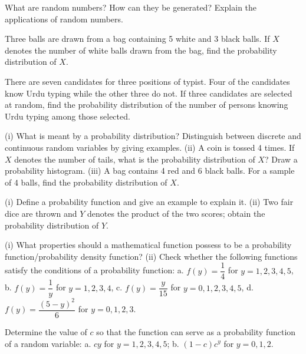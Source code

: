 \documentclass[11pt,a4paper]{article}
\begin{document}
\begin{longlist}
\item What are random numbers? How can they be generated? Explain the applications of random numbers.

\item Three balls are drawn from a bag containing 5 white and 3 black balls. If $X$ denotes the number of white balls drawn from the bag, find the probability distribution of $X$.

\item There are seven candidates for three positions of typist. Four of the candidates know Urdu typing while the other three do not. If three candidates are selected at random, find the probability distribution of the number of persons knowing Urdu typing among those selected.

\item (i) What is meant by a probability distribution? Distinguish between discrete and continuous random variables by giving examples. (ii) A coin is tossed 4 times. If $X$ denotes the number of tails, what is the probability distribution of $X$? Draw a probability histogram. (iii) A bag contains 4 red and 6 black balls. For a sample of 4 balls, find the probability distribution of $X$.

\item (i) Define a probability function and give an example to explain it. (ii) Two fair dice are thrown and $Y$ denotes the product of the two scores; obtain the probability distribution of $Y$.

\item (i) What properties should a mathematical function possess to be a probability function/probability density function? (ii) Check whether the following functions satisfy the conditions of a probability function: a. $f(y)=\dfrac{1}{4}$ for $y=1,2,3,4,5$, b. $f(y)=\dfrac{1}{y}$ for $y=1,2,3,4$, c. $f(y)=\dfrac{y}{15}$ for $y=0,1,2,3,4,5$, d. $f(y)=\dfrac{(5-y)^2}{6}$ for $y=0,1,2,3$.

\item Determine the value of $c$ so that the function can serve as a probability function of a random variable: a. $cy$ for $y=1,2,3,4,5$; b. $(1-c)c^y$ for $y=0,1,2$.


\end{longlist}
\end{document}
